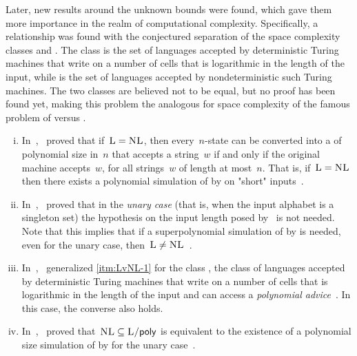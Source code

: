 Later, new results around the unknown bounds were found, which gave them more importance in the realm of computational complexity.
Specifically, a relationship was found with the conjectured separation of the space complexity classes \cL and \cNL.
The class \cL is the set of languages accepted by deterministic Turing machines that write on a number of cells that is logarithmic in the length of the input, while \cNL is the set of languages accepted by nondeterministic such Turing machines.
The two classes are believed not to be equal, but no proof has been found yet, making this problem the analogous for space complexity of the famous problem of \cP versus \cNP.
\begin{enumerate}[(i)]
	\item\label{itm:LvNL-1} In~\citeyear{BerLin77},~\citeauthor{BerLin77} proved that if~$\textsc{L}=\textsc{NL}$, then every~$n$-state \TNFA can be converted into a \TDFA of polynomial size in~$n$ that accepts a string~$w$ if and only if the original machine accepts~$w$, for all strings~$w$ of length at most~$n$.
	      That is, if~$\textsc{L}=\textsc{NL}$ then there exists a polynomial simulation of \TNFAs by \TDFAs on "short" inputs~\cite{BerLin77}.
	\item In~\citeyear{GefPig11},~\citeauthor{GefPig11} proved that in the \emph{unary case} (that is, when the input alphabet is a singleton set) the hypothesis on the input length posed by~\citeauthor{BerLin77} is not needed.
	      Note that this implies that if a superpolynomial simulation of \TNFAs by \TDFAs is needed, even for the unary case, then~$\textsc{L}\ne\textsc{NL}$~\cite{GefPig11}.
	\item In~\citeyear{Kap14},~\citeauthor{Kap14} generalized \ref{itm:LvNL-1} for the class \cPolyL, the class of languages accepted by deterministic Turing machines that write on a number of cells that is logarithmic in the length of the input and can access a \emph{polynomial advice}~\cite{Kap14,KarLip82}. In this case, the converse also holds.
	\item In~\citeyear{KapPig12},~\citeauthor{KapPig12} proved that~$\textsc{NL}\subseteq\textsc{L/\ensuremath{\mathsf{poly}}}$ is equivalent to the existence of a polynomial size simulation of \TNFAs by \TDFAs for the unary case~\cite{KapPig15}.
\end{enumerate}


